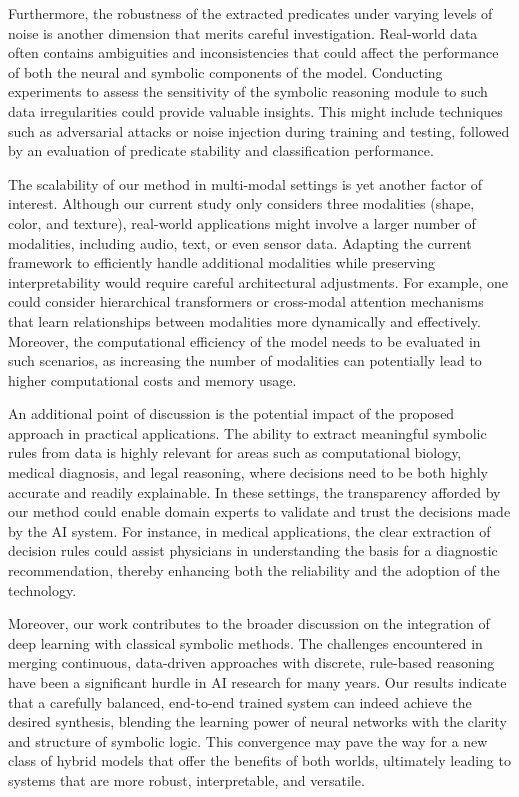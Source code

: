 \documentclass{article}
\begin{document}
Furthermore, the robustness of the extracted predicates under varying levels of noise is another dimension that merits careful investigation. Real-world data often contains ambiguities and inconsistencies that could affect the performance of both the neural and symbolic components of the model. Conducting experiments to assess the sensitivity of the symbolic reasoning module to such data irregularities could provide valuable insights. This might include techniques such as adversarial attacks or noise injection during training and testing, followed by an evaluation of predicate stability and classification performance.

The scalability of our method in multi-modal settings is yet another factor of interest. Although our current study only considers three modalities (shape, color, and texture), real-world applications might involve a larger number of modalities, including audio, text, or even sensor data. Adapting the current framework to efficiently handle additional modalities while preserving interpretability would require careful architectural adjustments. For example, one could consider hierarchical transformers or cross-modal attention mechanisms that learn relationships between modalities more dynamically and effectively. Moreover, the computational efficiency of the model needs to be evaluated in such scenarios, as increasing the number of modalities can potentially lead to higher computational costs and memory usage.

An additional point of discussion is the potential impact of the proposed approach in practical applications. The ability to extract meaningful symbolic rules from data is highly relevant for areas such as computational biology, medical diagnosis, and legal reasoning, where decisions need to be both highly accurate and readily explainable. In these settings, the transparency afforded by our method could enable domain experts to validate and trust the decisions made by the AI system. For instance, in medical applications, the clear extraction of decision rules could assist physicians in understanding the basis for a diagnostic recommendation, thereby enhancing both the reliability and the adoption of the technology.

Moreover, our work contributes to the broader discussion on the integration of deep learning with classical symbolic methods. The challenges encountered in merging continuous, data-driven approaches with discrete, rule-based reasoning have been a significant hurdle in AI research for many years. Our results indicate that a carefully balanced, end-to-end trained system can indeed achieve the desired synthesis, blending the learning power of neural networks with the clarity and structure of symbolic logic. This convergence may pave the way for a new class of hybrid models that offer the benefits of both worlds, ultimately leading to systems that are more robust, interpretable, and versatile.
\end{document}
